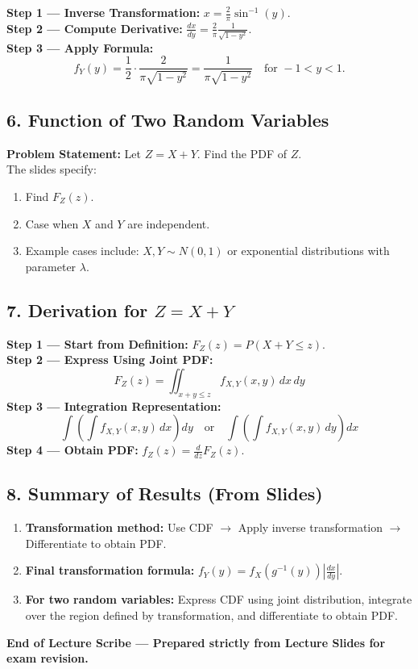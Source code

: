 \documentclass[11pt]{article}
\begin{document}
\textbf{Step 1 --- Inverse Transformation:} $x = \frac{2}{\pi} \sin^{-1}(y)$. \\
\textbf{Step 2 --- Compute Derivative:} $\frac{dx}{dy} = \frac{2}{\pi} \frac{1}{\sqrt{1-y^2}}$. \\
\textbf{Step 3 --- Apply Formula:}
\begin{equation}
    f_Y(y) = \frac{1}{2} \cdot \frac{2}{\pi \sqrt{1-y^2}} = \frac{1}{\pi \sqrt{1-y^2}} \quad \text{for } -1 < y < 1.
\end{equation}

\subsection*{6. Function of Two Random Variables}
\textbf{Problem Statement:} Let $Z = X + Y$. Find the PDF of $Z$. \\
The slides specify:
\begin{enumerate}
    \item Find $F_Z(z)$.
    \item Case when $X$ and $Y$ are independent.
    \item Example cases include: $X, Y \sim N(0, 1)$ or exponential distributions with parameter $\lambda$.
\end{enumerate}

\subsection*{7. Derivation for $Z = X + Y$}
\textbf{Step 1 --- Start from Definition:} $F_Z(z) = P(X + Y \leq z)$. \\
\textbf{Step 2 --- Express Using Joint PDF:}
\begin{equation}
    F_Z(z) = \iint_{x+y \leq z} f_{X,Y}(x, y) \, dx \, dy
\end{equation}
\textbf{Step 3 --- Integration Representation:}
\begin{equation}
    \int \left( \int f_{X,Y}(x, y) \, dx \right) dy \quad \text{or} \quad \int \left( \int f_{X,Y}(x, y) \, dy \right) dx
\end{equation}
\textbf{Step 4 --- Obtain PDF:} $f_Z(z) = \frac{d}{dz} F_Z(z)$.

\subsection*{8. Summary of Results (From Slides)}
\begin{enumerate}
    \item \textbf{Transformation method:} Use CDF $\rightarrow$ Apply inverse transformation $\rightarrow$ Differentiate to obtain PDF.
    \item \textbf{Final transformation formula:} $f_Y(y) = f_X(g^{-1}(y)) \left| \frac{dx}{dy} \right|$.
    \item \textbf{For two random variables:} Express CDF using joint distribution, integrate over the region defined by transformation, and differentiate to obtain PDF.
\end{enumerate}

\vfill
\noindent \textbf{End of Lecture Scribe --- Prepared strictly from Lecture Slides for exam revision.}
\end{document}
